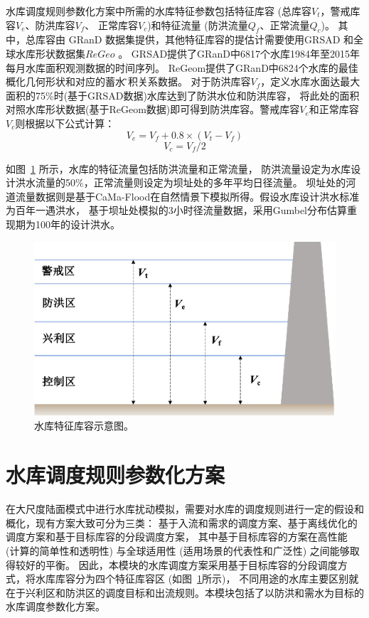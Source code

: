 水库调度规则参数化方案中所需的水库特征参数包括特征库容 (总库容$V_t$，警戒库容$V_e$、防洪库容$V_f$、
正常库容$V_c$)和特征流量 (防洪流量$Q_f$、正常流量$Q_c$)。
其中，总库容由 GRanD 数据集提供，其他特征库容的提估计需要使用GRSAD \citep{zhao2019towards}和全球水库形状数据集$ReGeo$ \citep{yigzaw2018new} 。
GRSAD提供了GRanD中6817个水库1984年至2015年每月水库面积观测数据的时间序列。
ReGeom提供了GRanD中6824个水库的最佳概化几何形状和对应的蓄水\~面积关系数据。
对于防洪库容$V_f$，定义水库水面达最大面积的75\%时(基于GRSAD数据)水库达到了防洪水位和防洪库容，
将此处的面积对照水库形状数据(基于ReGeom数据)即可得到防洪库容。警戒库容$V_e$和正常库容$V_c$则根据以下公式计算：
\begin{equation}
V_{e}=V_{f}+0.8 \times\left(V_{t}-V_{f}\right)
\end{equation}
\begin{equation}
V_{c}=V_{f} / 2
\end{equation}


如图~\ref{fig:水库特征库容示意图} 所示，水库的特征流量包括防洪流量和正常流量，
防洪流量设定为水库设计洪水流量的50\%，正常流量则设定为坝址处的多年平均日径流量。
坝址处的河道流量数据则是基于CaMa-Flood在自然情景下模拟所得。假设水库设计洪水标准为百年一遇洪水，
基于坝址处模拟的3小时径流量数据，采用Gumbel分布估算重现期为100年的设计洪水\citep{boulange2021}。

{
\begin{figure}[]
\centering
\includegraphics{Figures/陆地表面的水分循环/水库特征库容示意图.png}
\caption{水库特征库容示意图。}
\label{fig:水库特征库容示意图}
\end{figure}
}
\section{水库调度规则参数化方案}
在大尺度陆面模式中进行水库扰动模拟，需要对水库的调度规则进行一定的假设和概化，现有方案大致可分为三类：
基于入流和需求的调度方案、基于离线优化的调度方案和基于目标库容的分段调度方案，
其中基于目标库容的方案在高性能 (计算的简单性和透明性) 与全球适用性 (适用场景的代表性和广泛性) 之间能够取得较好的平衡\citep{yassin2019representation}。
因此，本模块的水库调度方案采用基于目标库容的分段调度方式，将水库库容分为四个特征库容区 (如图~\ref{fig:水库特征库容示意图}所示)，
不同用途的水库主要区别就在于兴利区和防洪区的调度目标和出流规则。本模块包括了以防洪和需水为目标的水库调度参数化方案。


